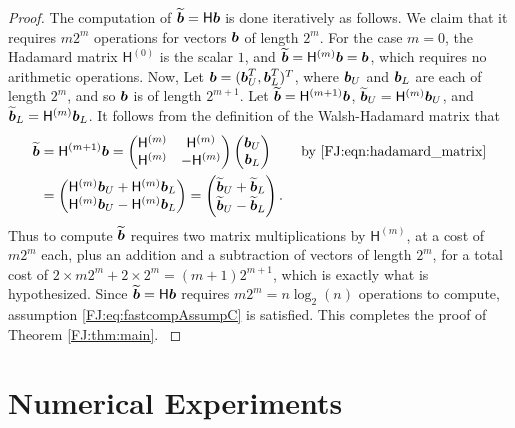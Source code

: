 \documentclass[graybox,footinfo]{svmult}
\begin{document}
\begin{proof}
{The computation of $\widetilde{{\boldsymbol{b}}} =\mathsf{H} {\boldsymbol{b}}$ is done iteratively as follows.  We claim that it requires $m2^m$ operations for vectors ${\boldsymbol{b}}$ of length $2^m$. For the case $m=0$, the Hadamard matrix $\mathsf{H}^{(0)}$ is the scalar $1$, and $\widetilde{{\boldsymbol{b}}} = \mathsf{H}^{(m)} {\boldsymbol{b}} = {\boldsymbol{b}}$, which requires no arithmetic operations.  Now, Let ${\boldsymbol{b}} = ({\boldsymbol{b}}_U^{T},  {\boldsymbol{b}}_L^{T})^T$, where ${\boldsymbol{b}}_U$ and ${\boldsymbol{b}}_L$ are each of length $2^m$, and so ${\boldsymbol{b}}$ is of length $2^{m+1}$.  Let $\widetilde{{\boldsymbol{b}}} = \mathsf{H}^{(m+1)} {\boldsymbol{b}}$,  $\widetilde{{\boldsymbol{b}}}_U = \mathsf{H}^{(m)} {\boldsymbol{b}}_U$, and $\widetilde{{\boldsymbol{b}}}_L = \mathsf{H}^{(m)} {\boldsymbol{b}}_L$.  It follows from the definition of the Walsh-Hadamard matrix that 
\begin{align*}
\widetilde{{\boldsymbol{b}}} &= \mathsf{H}^{({m+1})} {\boldsymbol{b}} = \begin{pmatrix}
\mathsf{H}^{(m)} & \mathsf{H}^{(m)} \\ \mathsf{H}^{(m)} & - \mathsf{H}^{(m)}
\end{pmatrix} 
\begin{pmatrix}
{\boldsymbol{b}}_U\\ {\boldsymbol{b}}_L
\end{pmatrix} \qquad \text{by \eqref{FJ:eqn:hadamard_matrix}} \\
&= 
\begin{pmatrix}
\mathsf{H}^{(m)} {\boldsymbol{b}}_U + \mathsf{H}^{(m)}{\boldsymbol{b}}_L \\ 
\mathsf{H}^{(m)} {\boldsymbol{b}}_U - \mathsf{H}^{(m)} {\boldsymbol{b}}_L
\end{pmatrix}
= 
\begin{pmatrix}
\widetilde{{\boldsymbol{b}}}_U + \widetilde{{\boldsymbol{b}}}_L \\ 
\widetilde{{\boldsymbol{b}}}_U - \widetilde{{\boldsymbol{b}}}_L
\end{pmatrix}.
\end{align*}
Thus to compute $\widetilde{{\boldsymbol{b}}}$ requires two matrix multiplications by $\mathsf{H}^{(m)}$, at a cost of $m 2^m$ each, plus an addition and a subtraction of vectors of length $2^m$, for a total cost of $2 \times m 2^m + 2 \times 2^m = (m+1) 2^{m+1}$, which is exactly what is hypothesized.  Since $\widetilde{{\boldsymbol{b}}} =\mathsf{H} {\boldsymbol{b}}$ requires $m2^m = n \log_2(n)$ operations to compute, assumption \eqref{FJ:eq:fastcompAssumpC} is satisfied.  This completes the proof of Theorem \ref{FJ:thm:main}.
}
\end{proof}




\section{Numerical Experiments}
\end{document}
